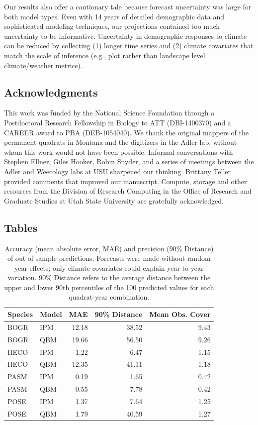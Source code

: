 \documentclass[12pt,]{article}
\begin{document}
Our results also offer a cautionary tale because forecast uncertainty
was large for both model types. Even with 14 years of detailed
demographic data and sophisticated modeling techniques, our projections
contained too much uncertainty to be informative. Uncertainty in
demographic responses to climate can be reduced by collecting (1) longer
time series and (2) climate covariates that match the scale of inference
(e.g., plot rather than landscape level climate/weather metrics).

\subsection{Acknowledgments}\label{acknowledgments}

This work was funded by the National Science Foundation through a
Postdoctoral Research Fellowship in Biology to ATT (DBI-1400370) and a
CAREER award to PBA (DEB-1054040). We thank the original mappers of the
permanent quadrats in Montana and the digitizers in the Adler lab,
without whom this work would not have been possible. Informal
conversations with Stephen Ellner, Giles Hooker, Robin Snyder, and a
series of meetings between the Adler and Weecology labs at USU sharpened
our thinking. Brittany Teller provided comments that improved our
manuscript. Compute, storage and other resources from the Division of
Research Computing in the Office of Research and Graduate Studies at
Utah State University are gratefully acknowledged.

\pagebreak{}

\setcounter{page}{29}

\subsection{Tables}\label{tables}

\begin{table}[ht]
\centering
\caption{Accuracy (mean absolute error, MAE) and precision (90\% Distance) of out of sample predictions. Forecasts were made without random year effects; only climate covariates could explain year-to-year variation. 90\% Distance refers to the average distance between the upper and lower 90th percentiles of the 100 predicted values for each quadrat-year combination.} 
\begin{tabular}{llrrr}
  \hline
Species & Model & MAE & 90\% Distance & Mean Obs. Cover \\ 
  \hline
BOGR & IPM & 12.18 & 38.52 & 9.43 \\ 
  BOGR & QBM & 19.66 & 56.50 & 9.26 \\ 
  HECO & IPM & 1.22 & 6.47 & 1.15 \\ 
  HECO & QBM & 12.35 & 41.11 & 1.18 \\ 
  PASM & IPM & 0.19 & 1.65 & 0.42 \\ 
  PASM & QBM & 0.55 & 7.78 & 0.42 \\ 
  POSE & IPM & 1.37 & 7.64 & 1.25 \\ 
  POSE & QBM & 1.79 & 40.59 & 1.27 \\ 
   \hline
\end{tabular}
\end{table}
\end{document}
